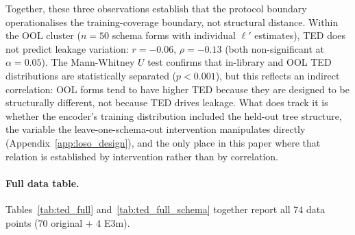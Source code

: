 Together, these three observations establish that the protocol boundary operationalises the training-coverage boundary, not structural distance. Within the OOL cluster ($n{=}50$ schema forms with individual $\ell'$ estimates), TED does not predict leakage variation: $r{=}{-}0.06$, $\rho{=}{-}0.13$ (both non-significant at $\alpha{=}0.05$). The Mann-Whitney $U$ test confirms that in-library and OOL TED distributions are statistically separated ($p{<}0.001$), but this reflects an indirect correlation: OOL forms tend to have higher TED because they are designed to be structurally different, not because TED drives leakage. What does track it is whether the encoder's training distribution included the held-out tree structure, the variable the leave-one-schema-out intervention manipulates directly (Appendix~\ref{app:loso_design}), and the only place in this paper where that relation is established by intervention rather than by correlation.

\paragraph{Full data table.} Tables~\ref{tab:ted_full} and~\ref{tab:ted_full_schema} together report all 74 data points (70 original + 4 E3m).

